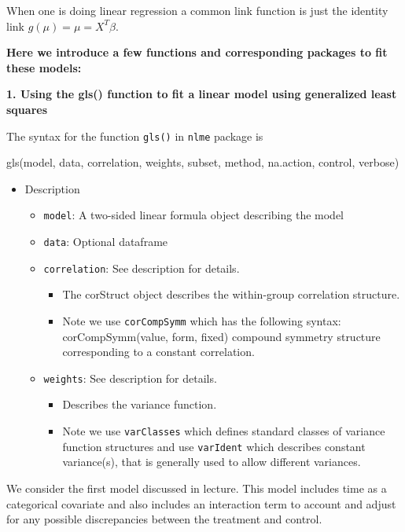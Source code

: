 \documentclass[
  letterpaper,
  DIV=11,
  numbers=noendperiod]{scrreprt}
\providecommand{\tightlist}{%
  \setlength{\itemsep}{0pt}\setlength{\parskip}{0pt}}\usepackage{longtable,booktabs,array}
\begin{document}
When one is doing linear regression a common link function is just the
identity link \(g(\mu) =\mu = X^T\beta\).

\textbf{Here we introduce a few functions and corresponding packages to
fit these models:}

\textbf{1. Using the gls() function to fit a linear model using
generalized least squares}

The syntax for the function \texttt{gls()} in \texttt{nlme} package is

gls(model, data, correlation, weights, subset, method, na.action,
control, verbose)

\begin{itemize}
\tightlist
\item
  Description

  \begin{itemize}
  \tightlist
  \item
    \texttt{model}: A two-sided linear formula object describing the
    model
  \item
    \texttt{data}: Optional dataframe
  \item
    \texttt{correlation}: See description for details.

    \begin{itemize}
    \tightlist
    \item
      The corStruct object describes the within-group correlation
      structure.
    \item
      Note we use \texttt{corCompSymm} which has the following syntax:
      corCompSymm(value, form, fixed) compound symmetry structure
      corresponding to a constant correlation.
    \end{itemize}
  \item
    \texttt{weights}: See description for details.

    \begin{itemize}
    \tightlist
    \item
      Describes the variance function.
    \item
      Note we use \texttt{varClasses} which defines standard classes of
      variance function structures and use \texttt{varIdent} which
      describes constant variance(s), that is generally used to allow
      different variances.
    \end{itemize}
  \end{itemize}
\end{itemize}

We consider the first model discussed in lecture. This model includes
time as a categorical covariate and also includes an interaction term to
account and adjust for any possible discrepancies between the treatment
and control.
\end{document}
